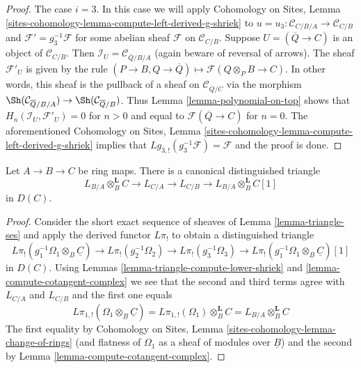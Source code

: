 \begin{proof}
\medskip\noindent
The case $i = 3$. In this case we will apply
Cohomology on Sites, Lemma
\ref{sites-cohomology-lemma-compute-left-derived-g-shriek}
to $u = u_3 : \mathcal{C}_{C/B/A} \to \mathcal{C}_{C/B}$
and $\mathcal{F}' = g_3^{-1}\mathcal{F}$ for some abelian sheaf
$\mathcal{F}$ on $\mathcal{C}_{C/B}$.
Suppose $U = (\overline{Q} \to C)$ is an object of $\mathcal{C}_{C/B}$.
Then $\mathcal{I}_U = \mathcal{C}_{\overline{Q}/B/A}$ (again beware
of reversal of arrows). The sheaf $\mathcal{F}'_U$ is given by the
rule $(P \to B, Q \to \overline{Q}) \mapsto \mathcal{F}(Q \otimes_P B \to C)$.
In other words, this sheaf is the pullback of a sheaf
on $\mathcal{C}_{\overline{Q}/C}$ via the morphism
$\Sh(\mathcal{C}_{\overline{Q}/B/A}) \to \Sh(\mathcal{C}_{\overline{Q}/B})$.
Thus Lemma \ref{lemma-polynomial-on-top} shows that
$H_n(\mathcal{I}_U, \mathcal{F}'_U) = 0$ for $n > 0$
and equal to $\mathcal{F}(\overline{Q} \to C)$ for $n = 0$.
The aforementioned Cohomology on Sites, Lemma
\ref{sites-cohomology-lemma-compute-left-derived-g-shriek}
implies that $Lg_{3, !}(g_3^{-1}\mathcal{F}) = \mathcal{F}$ and
the proof is done.
\end{proof}

\begin{proposition}
\label{proposition-triangle}
Let $A \to B \to C$ be ring maps. There is a canonical distinguished
triangle
$$
L_{B/A} \otimes_B^\mathbf{L} C \to L_{C/A} \to L_{C/B} \to
L_{B/A} \otimes_B^\mathbf{L} C[1]
$$
in $D(C)$.
\end{proposition}

\begin{proof}
Consider the short exact sequence of sheaves of
Lemma \ref{lemma-triangle-ses}
and apply the derived functor $L\pi_!$ to obtain a distinguished
triangle
$$
L\pi_!(g_1^{-1}\Omega_1 \otimes_{\underline{B}} \underline{C}) \to
L\pi_!(g_2^{-1}\Omega_2) \to
L\pi_!(g_3^{-1}\Omega_3) \to
L\pi_!(g_1^{-1}\Omega_1 \otimes_{\underline{B}} \underline{C})[1]
$$
in $D(C)$. Using Lemmas \ref{lemma-triangle-compute-lower-shriek} and
\ref{lemma-compute-cotangent-complex}
we see that the second and third terms agree with $L_{C/A}$ and $L_{C/B}$
and the first one equals
$$
L\pi_{1, !}(\Omega_1 \otimes_{\underline{B}} \underline{C}) =
L\pi_{1, !}(\Omega_1) \otimes_B^\mathbf{L} C =
L_{B/A} \otimes_B^\mathbf{L} C
$$
The first equality by Cohomology on Sites, Lemma
\ref{sites-cohomology-lemma-change-of-rings}
(and flatness of $\Omega_1$ as a sheaf of modules over $\underline{B}$)
and the second by Lemma \ref{lemma-compute-cotangent-complex}.
\end{proof}

